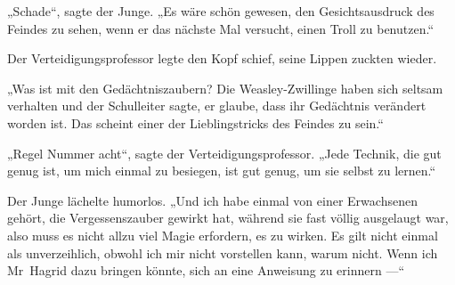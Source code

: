 „Schade“, sagte der Junge.
„Es wäre schön gewesen, den Gesichtsausdruck des Feindes zu sehen, wenn er das nächste Mal versucht, einen Troll zu benutzen.“

Der Verteidigungsprofessor legte den Kopf schief, seine Lippen zuckten wieder.

„Was ist mit den Gedächtniszaubern? Die Weasley-Zwillinge haben sich seltsam verhalten und der Schulleiter sagte, er glaube, dass ihr Gedächtnis verändert worden ist. Das scheint einer der Lieblingstricks des Feindes zu sein.“

„Regel Nummer acht“, sagte der Verteidigungsprofessor.
„Jede Technik, die gut genug ist, um mich einmal zu besiegen, ist gut genug, um sie selbst zu lernen.“

Der Junge lächelte humorlos.
„Und ich habe einmal von einer Erwachsenen gehört, die Vergessenszauber gewirkt hat, während sie fast völlig ausgelaugt war, also muss es nicht allzu viel Magie erfordern, es zu wirken. Es gilt nicht einmal als unverzeihlich, obwohl ich mir nicht vorstellen kann, warum nicht. Wenn ich Mr~Hagrid dazu bringen könnte, sich an eine Anweisung zu erinnern —“

